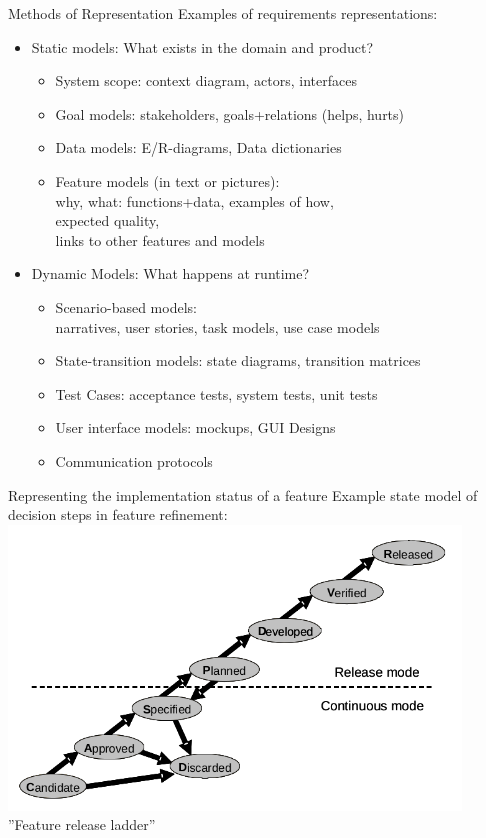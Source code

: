 \documentclass{beamer}
\begin{document}
\begin{frame}[fragile]{Methods of Representation}
Examples of requirements representations:
\begin{itemize}
\item Static models: What exists in the domain and product?
\begin{itemize}
\item System scope: context diagram, actors, interfaces
\item Goal models: stakeholders, goals+relations (helps, hurts)
\item Data models: E/R-diagrams, Data dictionaries
\item Feature models (in text or pictures):\\why, what: functions+data, examples of how,\\expected quality,\\links to other features and models
\end{itemize}
\item Dynamic Models: What happens at runtime?
\begin{itemize}
\item Scenario-based models:\\narratives, user stories, task models, use case models
\item State-transition models: state diagrams, transition matrices
\item Test Cases: acceptance tests, system tests, unit tests
\item User interface models: mockups, GUI Designs
\item Communication protocols
\end{itemize}
\end{itemize}
\end{frame}

\begin{frame}[fragile]{Representing the implementation status of a feature}
Example state model of decision steps in feature refinement:
\includegraphics[width=0.9\textwidth]{img/ladder}
''Feature release ladder''
\end{frame}
\end{document}
